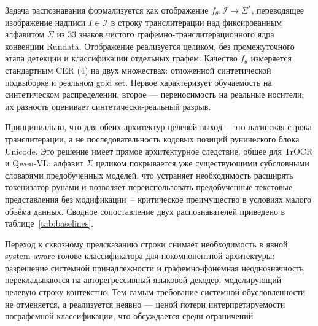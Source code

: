 \documentclass[a4paper,12pt]{extarticle}
\begin{document}
Задача распознавания формализуется как отображение $f_\theta: \mathcal{I} \to \Sigma^{*}$, переводящее изображение надписи $I \in \mathcal{I}$ в строку транслитерации над фиксированным алфавитом $\Sigma$ из 33 знаков чистого графемно-транслитерационного ядра конвенции Rundata. Отображение реализуется целиком, без промежуточного этапа детекции и классификации отдельных графем. Качество $f_\theta$ измеряется стандартным CER (4) на двух множествах: отложенной синтетической подвыборке и реальном gold set. Первое характеризует обучаемость на синтетическом распределении, второе — переносимость на реальные носители; их разность оценивает синтетически-реальный разрыв.
 
Принципиально, что для обеих архитектур целевой выход~-- это латинская строка транслитерации, а не последовательность кодовых позиций рунического блока Unicode. Это решение имеет прямое архитектурное следствие, общее для TrOCR и Qwen-VL: алфавит $\Sigma$ целиком покрывается уже существующими субсловными словарями предобученных моделей, что устраняет необходимость расширять токенизатор рунами и позволяет переиспользовать предобученные текстовые представления без модификации~-- критическое преимущество в условиях малого объёма данных. Сводное сопоставление двух распознавателей приведено в таблице~\ref{tab:baselines}.

Переход к сквозному предсказанию строки снимает необходимость в явной system-aware голове классификатора для покомпонентной архитектуры: разрешение системной принадлежности и графемно-фонемная неоднозначность перекладываются на авторегрессивный языковой декодер, моделирующий целевую строку контекстно. Тем самым требование системной обусловленности не отменяется, а реализуется неявно — ценой потери интерпретируемости пографемной классификации, что обсуждается среди ограничений
 
\end{document}
